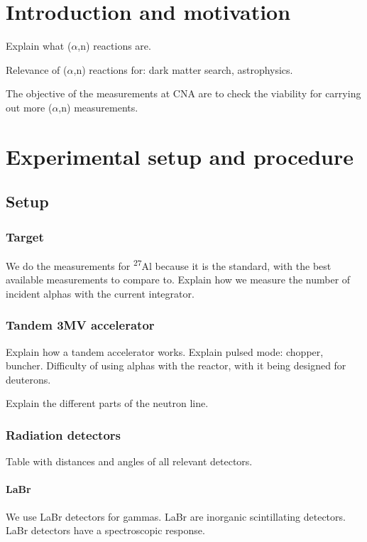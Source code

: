 \documentclass[a4paper,12pt]{report}
\author{Erik Cárdenas Mayoral}
\title{\HUGE{Title}}
\date{date}
\newcommand{\an}{($\alpha$,n) }
\newcommand{\Aliso}{\textsuperscript{27}Al }
\begin{document}
\maketitle

\begin{abstract}
Abstract
\end{abstract}

\tableofcontents

\chapter{Introduction and motivation}
Explain what \an reactions are.

Relevance of \an reactions for: dark matter search, astrophysics.

The objective of the measurements at CNA are to check the viability for carrying out more \an measurements.


\chapter{Experimental setup and procedure}
\section{Setup}
\subsection{Target}
We do the measurements for \Aliso because it is the standard, with the best available measurements to compare to.
Explain how we measure the number of incident alphas with the current integrator.

\subsection{Tandem 3MV accelerator}
Explain how a tandem accelerator works.
Explain pulsed mode: chopper, buncher.
Difficulty of using alphas with the reactor, with it being designed for deuterons.

Explain the different parts of the neutron line.

\subsection{Radiation detectors}
Table with distances and angles of all relevant detectors.

\subsubsection{LaBr}
We use LaBr detectors for gammas.
LaBr are inorganic scintillating detectors.
LaBr detectors have a spectroscopic response.
\end{document}
